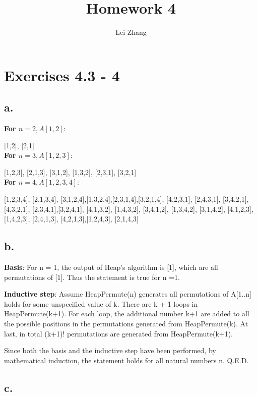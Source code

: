 \documentclass{article}
\title{Homework 4}
\author{Lei Zhang}
\begin{document}
\maketitle

\section{Exercises 4.3 - 4}

\subsection*{a. }

\textbf{For $n=2, A[1,2]$}: 

[1,2], [2,1]\\

\textbf{For $n=3, A[1,2,3]$}: 

[1,2,3], [2,1,3], [3,1,2], [1,3,2], [2,3,1], [3,2,1]\\

\textbf{For $n=4, A[1,2,3,4]$}: 

[1,2,3,4], [2,1,3,4], [3,1,2,4],[1,3,2,4],[2,3,1,4],[3,2,1,4], [4,2,3,1], [2,4,3,1], [3,4,2,1], [4,3,2,1], [2,3,4,1],[3,2,4,1], [4,1,3,2], [1,4,3,2], [3,4,1,2], [1,3,4,2], [3,1,4,2], [4,1,2,3],[1,4,2,3], [2,4,1,3], [4,2,1,3],[1,2,4,3], [2,1,4,3]

\subsection*{b. }

\textbf{Basis}: For n = 1, the output of Heap's algorithm is [1], which are all permutations of [1]. Thus the statement is true for n =1. 

\textbf{Inductive step}: Assume HeapPermute(n) generates all permutations of A[1..n] holds for some unspecified value of k. There are k + 1 loops in HeapPermute(k+1). For each loop, the additional number k+1 are added to all the possible positions in the permutations generated from  HeapPermute(k). At last, in total (k+1)! permutations are generated from HeapPermute(k+1). 

Since both the basis and the inductive step have been performed, by mathematical induction, the statement holds for all natural numbers n. Q.E.D.

\subsection*{c. }
\end{document}

